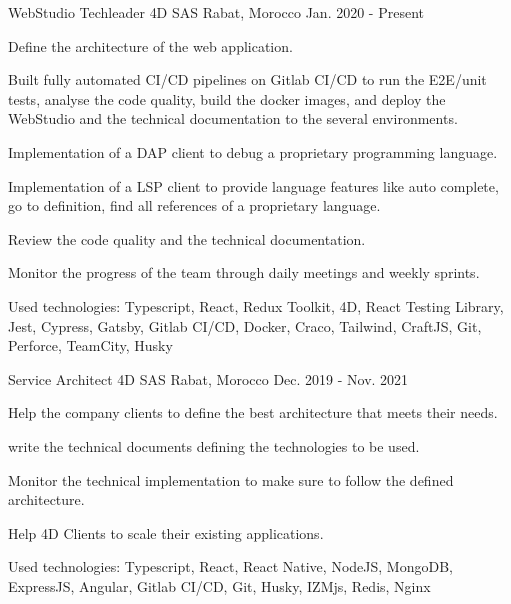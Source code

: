 

\begin{cventries}

  \cventry
    {WebStudio Techleader} %
    {4D SAS} %
    {Rabat, Morocco} %
    {Jan. 2020 - Present} %
    {
      \begin{cvitems} %
        \item {Define the architecture of the web application.}
        \item {Built fully automated CI/CD pipelines on Gitlab CI/CD to run the E2E/unit tests, analyse the code quality, build the docker images, and deploy the WebStudio and the technical documentation to the several environments.}
        \item {Implementation of a DAP client to debug a proprietary programming language.}
        \item {Implementation of a LSP client to provide language features like auto complete, go to definition, find all references of a proprietary language.}
        \item {Review the code quality and the technical documentation.}
        \item {Monitor the progress of the team through daily meetings and weekly sprints.}
        \item {Used technologies: Typescript, React, Redux Toolkit, 4D, React Testing Library, Jest, Cypress, Gatsby, Gitlab CI/CD, Docker, Craco, Tailwind, CraftJS, Git, Perforce, TeamCity, Husky}
      \end{cvitems}
    }

  \cventry
    {Service Architect} %
    {4D SAS} %
    {Rabat, Morocco} %
    {Dec. 2019 - Nov. 2021} %
    {
      \begin{cvitems} %
        \item {Help the company clients to define the best architecture that meets their needs.}
        \item {write the technical documents defining the technologies to be used.}
        \item {Monitor the technical implementation to make sure to follow the defined architecture.}
        \item {Help 4D Clients to scale their existing applications.}
        \item {Used technologies: Typescript, React, React Native, NodeJS, MongoDB, ExpressJS, Angular, Gitlab CI/CD, Git, Husky, IZMjs, Redis, Nginx}
      \end{cvitems}
    }


\end{cventries}
